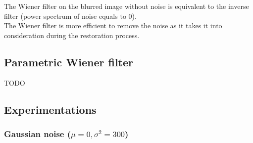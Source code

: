 \bigskip
The Wiener filter on the blurred image without noise is equivalent to the inverse filter (power spectrum of noise equals to 0). \\
The Wiener filter is more efficient to remove the noise as it takes it into consideration
during the restoration process.

\pagebreak
\subsection{Parametric Wiener filter}
TODO

\pagebreak
\subsection{Experimentations}

\subsubsection{Gaussian noise ($\mu = 0, \sigma^2 = 300$)}

